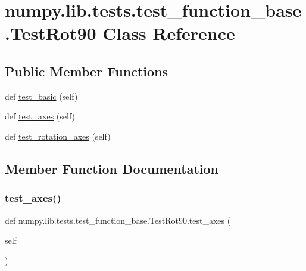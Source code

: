 \hypertarget{classnumpy_1_1lib_1_1tests_1_1test__function__base_1_1TestRot90}{}\section{numpy.\+lib.\+tests.\+test\+\_\+function\+\_\+base.\+Test\+Rot90 Class Reference}
\label{classnumpy_1_1lib_1_1tests_1_1test__function__base_1_1TestRot90}
\subsection*{Public Member Functions}
\begin{DoxyCompactItemize}
\item 
def \hyperlink{classnumpy_1_1lib_1_1tests_1_1test__function__base_1_1TestRot90_a10b9f456e4b6e453a86ffb9bd904df62}{test\+\_\+basic} (self)
\item 
def \hyperlink{classnumpy_1_1lib_1_1tests_1_1test__function__base_1_1TestRot90_a4b7d8986bc190942096a2b4136e45a16}{test\+\_\+axes} (self)
\item 
def \hyperlink{classnumpy_1_1lib_1_1tests_1_1test__function__base_1_1TestRot90_a3af1ae0c40c2f7bf4693c2be0de39094}{test\+\_\+rotation\+\_\+axes} (self)
\end{DoxyCompactItemize}


\subsection{Member Function Documentation}
\mbox{\label{classnumpy_1_1lib_1_1tests_1_1test__function__base_1_1TestRot90_a4b7d8986bc190942096a2b4136e45a16}} 
\subsubsection{\texorpdfstring{test\+\_\+axes()}{test\_axes()}}
{\footnotesize\ttfamily def numpy.\+lib.\+tests.\+test\+\_\+function\+\_\+base.\+Test\+Rot90.\+test\+\_\+axes (\begin{DoxyParamCaption}\item[{}]{self }\end{DoxyParamCaption})}

